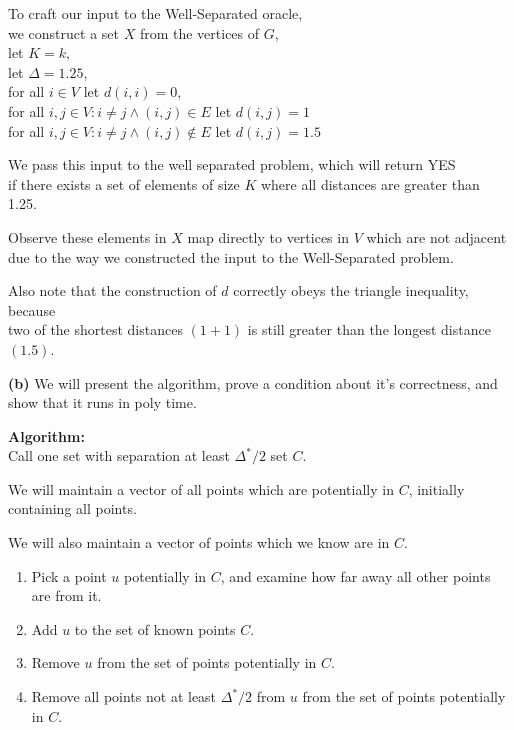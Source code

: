 \documentclass[11pt]{article}
\renewcommand{\part}[1] {\vspace{.10in} {\bf (#1)}}
\begin{document}
To craft our input to the Well-Separated oracle,\\
we construct a set $X$ from the vertices of $G$,\\
let $K = k$,\\
let $\Delta = 1.25$,\\
for all $i \in V$ let $d(i,i) = 0$,\\
for all $i,j \in V : i \neq j \wedge (i,j) \in E$ let $d(i,j) = 1$\\
for all $i,j \in V : i \neq j \wedge (i,j) \notin E$ let $d(i,j) = 1.5$

We pass this input to the well separated problem, which will return YES\\
if there exists a set of elements of size $K$ where all distances are greater than 1.25.

Observe these elements in $X$ map directly to vertices in $V$ which are not adjacent\\
due to the way we constructed the input to the Well-Separated problem.

Also note that the construction of $d$ correctly obeys the triangle inequality, because\\
two of the shortest distances $(1 + 1)$ is still greater than the longest distance $(1.5)$.


\part{b}
We will present the algorithm, prove a condition about it's correctness, and show that it runs in poly time.

\textbf{Algorithm:}\\
Call one set with separation at least $\Delta^{*} / 2$ set $C$.

We will maintain a vector of all points which are potentially in $C$, initially containing all points.

We will also maintain a vector of points which we know are in $C$.

\begin{enumerate}
\item Pick a point $u$ potentially in $C$, and examine how far away all other points are from it.
\item Add $u$ to the set of known points $C$.
\item Remove $u$ from the set of points potentially in $C$.
\item Remove all points not at least $\Delta^{*} / 2$ from $u$ from the set of points potentially in $C$.
\end{enumerate}
\end{document}
